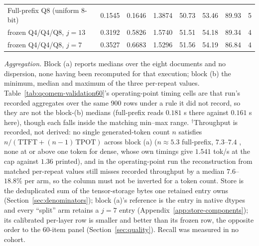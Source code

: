 \begin{table}[t]
\begin{tabular}{@{}lrrrrrrr@{}}
Full-prefix Q8 (uniform 8-bit) & 0.1545 & 0.1646 & 1.3874 & 50.73 & 53.46 & 89.93 & 5 \\
\qcomem{} frozen Q4/Q4/Q8, $j=13$ & 0.3192 & 0.5826 & 1.5740 & 51.51 & 54.18 & 89.34 & 4 \\
\qcomem{} frozen Q4/Q4/Q8, $j=7$ & 0.3527 & 0.6683 & 1.5296 & 51.56 & 54.19 & 86.84 & 4 \\
\bottomrule
\end{tabular}
\vspace{0.5mm}
\parbox{0.97\textwidth}{\scriptsize \emph{Aggregation.} Block (a) reports medians
over the eight documents and no dispersion, none having been recomputed for that
execution; block (b) the minimum, median and maximum of the three per-repeat
values.  Table~\ref{tab:qcomem-validation60}'s operating-point timing cells are
that run's recorded aggregates over the same 900 rows under a rule it did not
record, so they are not the block-(b) medians (full-prefix reads $0.181$ s there
against $0.161$ s here), though each falls inside the matching min--max range.
$^{\dagger}$Throughput is recorded, not derived: no single generated-token count
$n$ satisfies $n/(\mathrm{TTFT}+(n-1)\,\mathrm{TPOT})$ across block (a)
($n\approx5.3$ full-prefix, $7.3$--$7.4$ \qcomem{}, none at or above one token
for dense, whose own timings give $1.541$ tok/s at the cap against $1.36$
printed), and in the operating-point run the reconstruction from matched
per-repeat values still misses recorded throughput by a median $7.6$--$18.8\%$
per arm, so the column must not be inverted for a token count.  Store is the
deduplicated sum of the tensor-storage bytes one retained entry owns
(Section~\ref{sec:denominators}); block (a)'s reference is the entry in native
dtypes and every ``split'' arm retains a $j=7$ entry
(Appendix~\ref{app:store-components}); its calibrated per-layer row is smaller
and better than its frozen row, the opposite order to the 60-item panel
(Section~\ref{sec:quality}).  Recall was measured in no cohort.}
\end{table}
